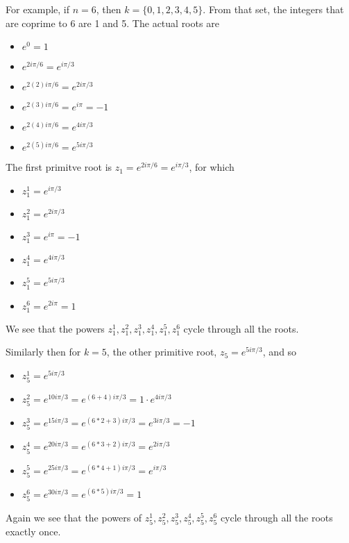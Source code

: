 For example, if $n=6$, then $k = \{ 0, 1, 2, 3, 4, 5 \}$.
From that set, the integers that are coprime to 6 are 1 and 5.
The actual roots are
\begin{itemize}
    \item $e^{0} = 1$
    \item $e^{2i\pi / 6} = e^{i\pi / 3}$
    \item $e^{2(2)i\pi / 6} = e^{2i\pi / 3}$
    \item $e^{2(3)i\pi / 6} = e^{i\pi} = -1$
    \item $e^{2(4)i\pi / 6} = e^{4i\pi / 3}$
    \item $e^{2(5)i\pi / 6} = e^{5i\pi / 3}$
\end{itemize}

The first primitve root is $z_1 = e^{2i\pi / 6} = e^{i\pi / 3}$,
for which
\begin{itemize}
    \item $z_{1}^{1} = e^{i\pi / 3}$
    \item $z_{1}^{2} = e^{2i\pi / 3}$
    \item $z_{1}^{3} = e^{i\pi} = -1$
    \item $z_{1}^{4} = e^{4i\pi / 3}$
    \item $z_{1}^{5} = e^{5i\pi / 3}$
    \item $z_{1}^{6} = e^{2i\pi } = 1$
\end{itemize}

We see that the powers $z_{1}^{1}, z_{1}^{2}, z_{1}^{3}, z_{1}^{4}, z_{1}^{5}, z_{1}^{6}$ cycle through all the roots.

Similarly then for $k = 5$, the other primitive root, $z_{5} = e^{5i\pi / 3}$, and so
\begin{itemize}
    \item $z_{5}^{1} = e^{5i\pi / 3}$
    \item $z_{5}^{2} = e^{10i\pi / 3} = e^{(6+4)i\pi / 3} = 1 \cdot e^{4i\pi / 3}$
    \item $z_{5}^{3} = e^{15i\pi / 3} = e^{(6*2+3)i\pi / 3} = e^{3i\pi / 3} = -1$
    \item $z_{5}^{4} = e^{20i\pi / 3} = e^{(6*3+2)i\pi / 3} = e^{2i\pi / 3}$
    \item $z_{5}^{5} = e^{25i\pi / 3} = e^{(6*4+1)i\pi / 3} = e^{i\pi / 3}$
    \item $z_{5}^{6} = e^{30i\pi / 3} = e^{(6*5)i\pi / 3} = 1$
\end{itemize}

Again we see that the powers of $z_{5}^{1}, z_{5}^{2}, z_{5}^{3}, z_{5}^{4}, z_{5}^{5}, z_{5}^{6}$ cycle through all the roots
exactly once.

